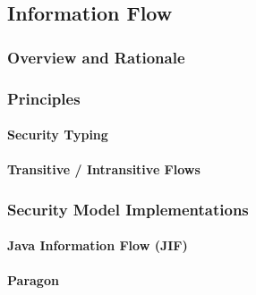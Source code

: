 \subsection{Information Flow}

\subsubsection{Overview and Rationale}

\subsubsection{Principles}

	\paragraph{Security Typing}
	
	\paragraph{Transitive / Intransitive Flows}

\subsubsection{Security Model Implementations}

	\paragraph{Java Information Flow (JIF)}
	
	\paragraph{Paragon}